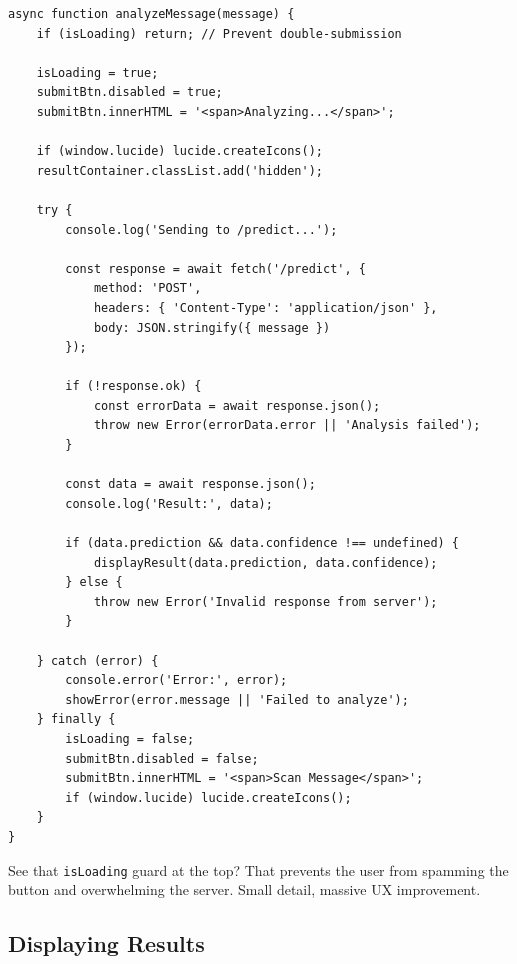 \documentclass[12pt, a4paper]{article}
\begin{document}
\begin{verbatim}
async function analyzeMessage(message) {
    if (isLoading) return; // Prevent double-submission
    
    isLoading = true;
    submitBtn.disabled = true;
    submitBtn.innerHTML = '<span>Analyzing...</span>';
    
    if (window.lucide) lucide.createIcons();
    resultContainer.classList.add('hidden');
    
    try {
        console.log('Sending to /predict...');
        
        const response = await fetch('/predict', {
            method: 'POST',
            headers: { 'Content-Type': 'application/json' },
            body: JSON.stringify({ message })
        });
        
        if (!response.ok) {
            const errorData = await response.json();
            throw new Error(errorData.error || 'Analysis failed');
        }
        
        const data = await response.json();
        console.log('Result:', data);
        
        if (data.prediction && data.confidence !== undefined) {
            displayResult(data.prediction, data.confidence);
        } else {
            throw new Error('Invalid response from server');
        }
        
    } catch (error) {
        console.error('Error:', error);
        showError(error.message || 'Failed to analyze');
    } finally {
        isLoading = false;
        submitBtn.disabled = false;
        submitBtn.innerHTML = '<span>Scan Message</span>';
        if (window.lucide) lucide.createIcons();
    }
}
\end{verbatim}

\begin{highlight}
    See that \texttt{isLoading} guard at the top? That prevents the user from spamming the button and overwhelming the server. Small detail, massive UX improvement.
\end{highlight}

\subsection{Displaying Results}
\end{document}
